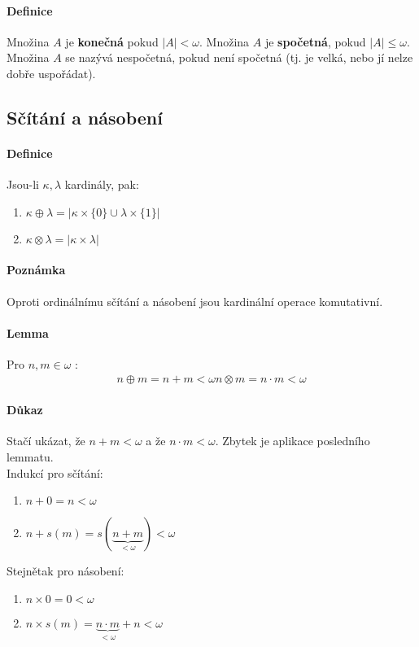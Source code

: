 \documentclass[a4paper,12pt,titlepage]{article}
\begin{document}
\begin{enumerate}
\paragraph{Definice}
Množina $A$ je \textbf{konečná} pokud $|A| \lt \omega$. Množina $A$ je
\textbf{spočetná}, pokud $|A| \le \omega$. Množina $A$ se nazývá nespočetná, pokud
není spočetná (tj. je velká, nebo jí nelze dobře uspořádat).
\subsection{Sčítání a násobení}
\setcounter{equation}{0}
\paragraph{Definice}
Jsou-li $\kappa, \lambda$ kardinály, pak:
\begin{enumerate}
	\item $\kappa \oplus \lambda = |\kappa \times\{0\} \cup \lambda\times\{1\}|$
	\item $\kappa \otimes \lambda = |\kappa \times \lambda|$
\end{enumerate}
\paragraph{Poznámka}
Oproti ordinálnímu sčítání a násobení jsou kardinální operace komutativní.
\paragraph{Lemma}
Pro $n,m \in \omega$ :
\begin{align}
	n \oplus m = n + m < \omega
	n \otimes m = n \cdot m < \omega
\end{align}
\paragraph{Důkaz}
Stačí ukázat, že $n+m < \omega$ a že $n \cdot m < \omega$. Zbytek je aplikace
posledního lemmatu. \\
Indukcí pro sčítání:
\begin{enumerate}
	\item $n+0 = n < \omega$
	\item $n + s(m) = s(\underbrace{n+m}_{<\omega}) < \omega$ 
\end{enumerate}
Stejnětak pro násobení:
\begin{enumerate}
	\item $n\times 0 = 0 < \omega$
	\item $n \times s(m) = \underbrace{n \cdot m}_{<\omega} + n < \omega$
\end{enumerate}

\end{enumerate}
\end{document}
